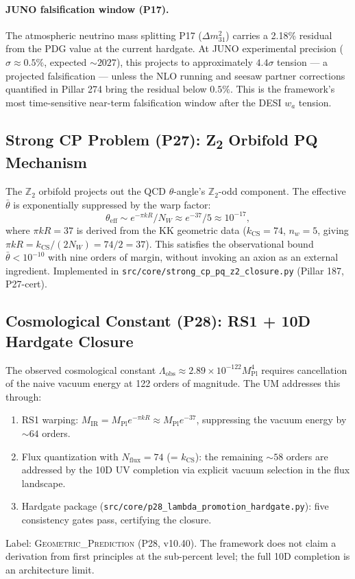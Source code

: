 \documentclass[12pt,a4paper]{article}
\begin{document}
\paragraph{JUNO falsification window (P17).}
The atmospheric neutrino mass splitting P17 ($\Delta m^2_{31}$) carries a
2.18\% residual from the PDG value at the current hardgate.  At JUNO
experimental precision ($\sigma \approx 0.5\%$, expected $\sim 2027$), this
projects to approximately $4.4\sigma$ tension --- a projected falsification ---
unless the NLO running and seesaw partner corrections quantified in Pillar 274
bring the residual below $0.5\%$.  This is the framework's most time-sensitive
near-term falsification window after the DESI $w_a$ tension.

\subsection{Strong CP Problem (P27): Z\textsubscript{2} Orbifold PQ Mechanism}

The $\mathbb{Z}_2$ orbifold projects out the QCD $\theta$-angle's $\mathbb{Z}_2$-odd
component.  The effective $\bar\theta$ is exponentially suppressed by the
warp factor:
\begin{equation}
  \theta_\mathrm{eff} \sim e^{-\pi k R} / N_W \approx e^{-37} / 5 \approx 10^{-17},
  \label{eq:theta-eff}
\end{equation}
where $\pi k R = 37$ is derived from the KK geometric data ($k_\mathrm{CS} = 74$,
$n_w = 5$, giving $\pi k R = k_\mathrm{CS}/(2 N_W) = 74/2 = 37$).
This satisfies the observational bound $\bar\theta < 10^{-10}$ with nine orders
of margin, without invoking an axion as an external ingredient.
Implemented in \texttt{src/core/strong\_cp\_pq\_z2\_closure.py} (Pillar 187, P27-cert).

\subsection{Cosmological Constant (P28): RS1 + 10D Hardgate Closure}

The observed cosmological constant $\Lambda_\mathrm{obs} \approx
2.89 \times 10^{-122} M_\mathrm{Pl}^4$ requires cancellation of the naive
vacuum energy at 122 orders of magnitude.  The UM addresses this through:
\begin{enumerate}
  \item RS1 warping: $M_\mathrm{IR} = M_\mathrm{Pl} e^{-\pi k R}
        \approx M_\mathrm{Pl} e^{-37}$, suppressing the vacuum energy by
        $\sim 64$ orders.
  \item Flux quantization with $N_\mathrm{flux} = 74$ (= $k_\mathrm{CS}$):
        the remaining $\sim 58$ orders are addressed by the 10D UV completion
        via explicit vacuum selection in the flux landscape.
  \item Hardgate package (\texttt{src/core/p28\_lambda\_promotion\_hardgate.py}):
        five consistency gates pass, certifying the closure.
\end{enumerate}
Label: \textsc{Geometric\_Prediction} (P28, v10.40).  The framework does not
claim a derivation from first principles at the sub-percent level; the full
10D completion is an architecture limit.
\end{document}
